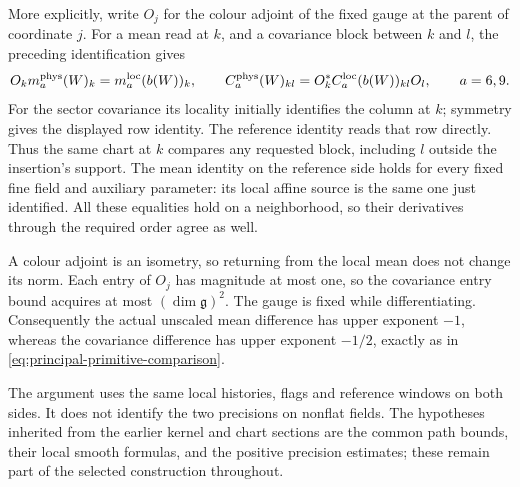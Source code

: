 More explicitly, write $O_j$ for the colour adjoint of the fixed
gauge at the parent of coordinate $j$. For a mean read at $k$,
and a covariance block between $k$ and $l$, the preceding
identification gives
\[
 O_k m_a^{\rm phys}(W)_k=m_a^{\rm loc}(b(W))_k,
 \qquad
 C_a^{\rm phys}(W)_{kl}
   =O_k^* C_a^{\rm loc}(b(W))_{kl}O_l,\qquad a=6,9.
\]
For the sector covariance its locality initially identifies the
column at $k$; symmetry gives the displayed row identity. The
reference identity reads that row directly. Thus the same
chart at $k$ compares any requested block, including $l$ outside
the insertion's support. The mean identity on the reference
side holds for every fixed fine field and auxiliary parameter:
its local affine source is the same one just identified.
All these equalities hold on a neighborhood, so their derivatives
through the required order agree as well.

A colour adjoint is an isometry, so returning from the local
mean does not change its norm. Each entry of $O_j$ has magnitude
at most one, so the covariance entry bound acquires at most
$(\dim\mathfrak g)^2$. The gauge is fixed while differentiating.
Consequently the actual unscaled mean difference
has upper exponent $-1$, whereas the covariance difference has
upper exponent $-1/2$, exactly as in
\eqref{eq:principal-primitive-comparison}.

The argument uses the same local histories, flags and reference
windows on both sides. It does not identify the two precisions
on nonflat fields. The hypotheses inherited from the earlier
kernel and chart sections are the common path bounds, their
local smooth formulas, and the positive precision estimates;
these remain part of the selected construction throughout.
